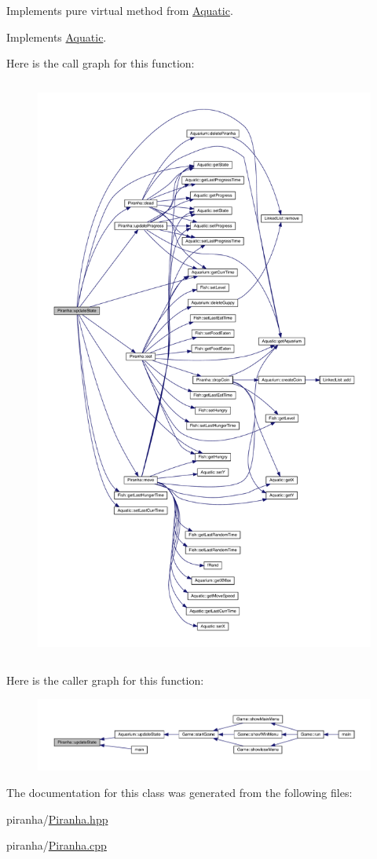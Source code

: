 Implements pure virtual method from \mbox{\hyperlink{class_aquatic}{Aquatic}}. 



Implements \mbox{\hyperlink{class_aquatic_a51e44c95476d72a841fea667c6cbbedc}{Aquatic}}.

Here is the call graph for this function\+:\nopagebreak
\begin{figure}[H]
\begin{center}
\leavevmode
\includegraphics[height=550pt]{class_piranha_a851c302af9de1d6eaf727242e2912f62_cgraph}
\end{center}
\end{figure}
Here is the caller graph for this function\+:
\nopagebreak
\begin{figure}[H]
\begin{center}
\leavevmode
\includegraphics[width=350pt]{class_piranha_a851c302af9de1d6eaf727242e2912f62_icgraph}
\end{center}
\end{figure}


The documentation for this class was generated from the following files\+:\begin{DoxyCompactItemize}
\item 
piranha/\mbox{\hyperlink{_piranha_8hpp}{Piranha.\+hpp}}\item 
piranha/\mbox{\hyperlink{_piranha_8cpp}{Piranha.\+cpp}}\end{DoxyCompactItemize}
